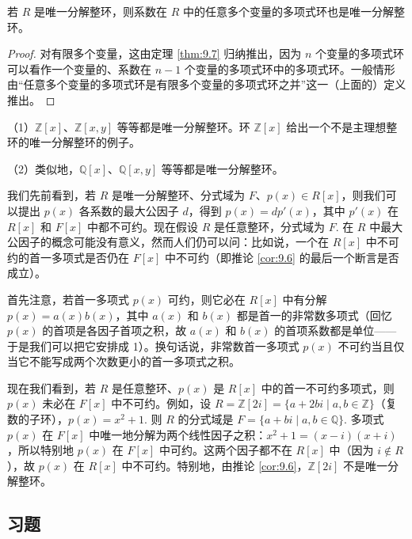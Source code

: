 \begin{corollary}\label{cor:9.8}
若 \(R\) 是唯一分解整环，则系数在 \(R\) 中的任意多个变量的多项式环也是唯一分解整环。
\end{corollary}

\begin{proof}
对有限多个变量，这由定理 \ref{thm:9.7} 归纳推出，因为 \(n\) 个变量的多项式环可以看作一个变量的、系数在 \(n-1\) 个变量的多项式环中的多项式环。一般情形由“任意多个变量的多项式环是有限多个变量的多项式环之并”这一（上面的）定义推出。
\end{proof}

\begin{example}
（1）\(\mathbb{Z}[x]\)、\(\mathbb{Z}[x, y]\) 等等都是唯一分解整环。环 \(\mathbb{Z}[x]\) 给出一个不是主理想整环的唯一分解整环的例子。

（2）类似地，\(\mathbb{Q}[x]\)、\(\mathbb{Q}[x, y]\) 等等都是唯一分解整环。
\end{example}

我们先前看到，若 \(R\) 是唯一分解整环、分式域为 \(F\)、\(p(x) \in R[x]\)，则我们可以提出 \(p(x)\) 各系数的最大公因子 \(d\)，得到 \(p(x) = dp'(x)\)，其中 \(p'(x)\) 在 \(R[x]\) 和 \(F[x]\) 中都不可约。现在假设 \(R\) 是任意整环，分式域为 \(F\). 在 \(R\) 中最大公因子的概念可能没有意义，然而人们仍可以问：比如说，一个在 \(R[x]\) 中不可约的首一多项式是否仍在 \(F[x]\) 中不可约（即推论 \ref{cor:9.6} 的最后一个断言是否成立）。

首先注意，若首一多项式 \(p(x)\) 可约，则它必在 \(R[x]\) 中有分解 \(p(x) = a(x)b(x)\)，其中 \(a(x)\) 和 \(b(x)\) 都是首一的非常数多项式（回忆 \(p(x)\) 的首项是各因子首项之积，故 \(a(x)\) 和 \(b(x)\) 的首项系数都是单位——于是我们可以把它安排成 1）。换句话说，非常数首一多项式 \(p(x)\) 不可约当且仅当它不能写成两个次数更小的首一多项式之积。

现在我们看到，若 \(R\) 是任意整环、\(p(x)\) 是 \(R[x]\) 中的首一不可约多项式，则 \(p(x)\) 未必在 \(F[x]\) 中不可约。例如，设 \(R = \mathbb{Z}[2i] = \{a+2bi \mid a, b \in \mathbb{Z}\}\)（复数的子环），\(p(x) = x^2+1\). 则 \(R\) 的分式域是 \(F = \{a+bi \mid a, b \in \mathbb{Q}\}\). 多项式 \(p(x)\) 在 \(F[x]\) 中唯一地分解为两个线性因子之积：\(x^2+1 = (x-i)(x+i)\)，所以特别地 \(p(x)\) 在 \(F[x]\) 中可约。这两个因子都不在 \(R[x]\) 中（因为 \(i \notin R\)），故 \(p(x)\) 在 \(R[x]\) 中不可约。特别地，由推论 \ref{cor:9.6}，\(\mathbb{Z}[2i]\) 不是唯一分解整环。

\subsection*{习题}

